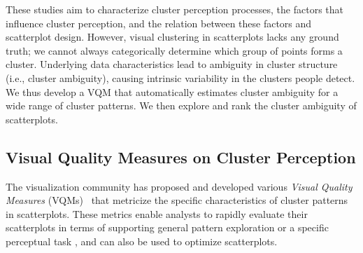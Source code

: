 These studies aim to 
characterize cluster perception processes, 
the factors that influence cluster perception, and the relation between these factors and scatterplot design. However, 
visual clustering in scatterplots 
lacks any ground truth; we cannot always categorically determine which group of points forms a cluster. 
Underlying data characteristics lead to ambiguity in cluster structure (i.e., cluster ambiguity), causing intrinsic variability in 
the clusters people detect.
We thus develop a VQM that automatically estimates cluster ambiguity
for a wide range of cluster patterns. We then explore and rank the cluster ambiguity of scatterplots.

\subsection{Visual Quality Measures on Cluster Perception}

\label{sec:vqmcp}


The visualization community has proposed and developed various \textit{Visual Quality Measures} (VQMs)~\cite{bertini2011quality, behrisch2018quality} 
that metricize the specific characteristics of cluster patterns in scatterplots.
These metrics enable analysts to rapidly evaluate their scatterplots in terms of supporting general pattern exploration \cite{brehmer2013multi} or a specific perceptual task \cite{amar2005low}, and can also be used to optimize scatterplots\cite{quadri22tvcg}. 
% 

